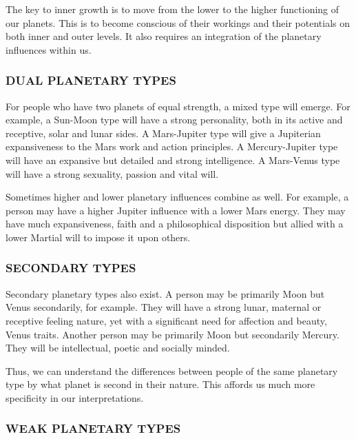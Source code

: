 

The key to inner growth is to move from the lower to the higher functioning of our planets. This is to become conscious of their workings and their potentials on both inner and outer levels. It also requires an integration of the planetary influences within us.

 

\subsubsection{DUAL PLANETARY TYPES}

 

For people who have two planets of equal strength, a mixed type will emerge. For example, a Sun-Moon type will have a strong personality, both in its active and receptive, solar and lunar sides. A Mars-Jupiter type will give a Jupiterian expansiveness to the Mars work and action principles. A Mercury-Jupiter type will have an expansive but detailed and strong intelligence. A Mars-Venus type will have a strong sexuality, passion and vital will.

 

Sometimes higher and lower planetary influences combine as well. For example, a person may have a higher Jupiter influence with a lower Mars energy. They may have much expansiveness, faith and a philosophical disposition but allied with a lower Martial will to impose it upon others.

 

\subsubsection{SECONDARY TYPES}

 

Secondary planetary types also exist. A person may be primarily Moon but Venus secondarily, for example. They will have a strong lunar, maternal or receptive feeling nature, yet with a significant need for affection and beauty, Venus traits. Another person may be primarily Moon but secondarily Mercury. They will be intellectual, poetic and socially minded.

 

Thus, we can understand the differences between people of the same planetary type by what planet is second in their nature. This affords us much more specificity in our interpretations.

 

\subsubsection{WEAK PLANETARY TYPES}

